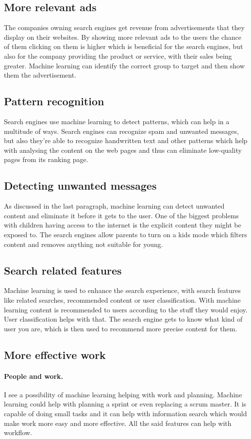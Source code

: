 \documentclass[10pt,a4paper]{article}
\begin{document}
\subsection{More relevant ads}
\cite{Sunny:MLiSE}The companies owning search engines get revenue from advertisements that they display on their websites. By showing more relevant ads to the users the chance of them clicking on them is higher which is beneficial for the search engines, but also for the company providing the product or service, with their sales being greater.  Machine learning can identify the correct group to target and then show them the advertisement. 
\subsection{Pattern recognition}
\cite{Sunny:MLiSE}Search engines use machine learning to detect patterns, which can help in a multitude of ways. Search engines can recognize spam and unwanted messages, but also they're able to recognize handwritten text and other patterns which help with analysing the content on the web pages and thus can eliminate low-quality pages from its ranking page. 
\subsection{Detecting unwanted messages}
\cite{Sunny:MLiSE}As discussed in the last paragraph, machine learning can detect unwanted content and eliminate it before it gets to the user. One of the biggest problems with children having access to the internet is the explicit content they might be exposed to. The search engines allow parents to turn on a kids mode which filters content and removes anything not suitable for young.
\subsection{Search related features}
\cite{Sunny:MLiSE}Machine learning is used to enhance the search experience, with search features like related searches, recommended content or user classification. With machine learning content is recommended to users according to the stuff they would enjoy. User classification helps with that. The search engine gets to know what kind of user you are, which is then used to recommend more precise content for them. 
\subsection{More effective work}
\paragraph{People and work.}I see a possibility of machine learning helping with work and planning. Machine learning could help with planning a sprint or even replacing a scrum master. It is capable of doing small tasks and it can help with information search which would make work more easy and more effective. All the said features can help with workflow. 
\end{document}
